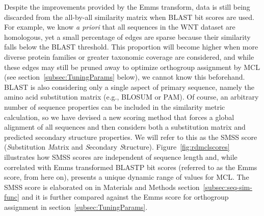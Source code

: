 \documentclass[twocolumn]{bmcart}  %
\begin{document}
Despite the improvements provided by the Emms transform, data is still being discarded from the all-by-all similarity matrix when BLAST bit scores are used.
For example, we know \textit{a priori} that all sequences in the WNT dataset are homologous, yet a small percentage of edges are sparse because their similarity falls below the BLAST threshold.
This proportion will become higher when more diverse protein families or greater taxonomic coverage are considered, and while these edges may still be pruned away to optimize orthogroup assignment by MCL (see section~\ref{subsec:TuningParams} below), we cannot know this beforehand.
BLAST is also considering only a single aspect of primary sequence, namely the amino acid substitution matrix (e.g., BLOSUM or PAM).
Of course, an arbitrary number of sequence properties can be included in the similarity metric calculation, so we have devised a new scoring method that forces a global alignment of all sequences and then considers both a substitution matrix and predicted secondary structure properties.
We will refer to this as the SMSS score (\textit{S}ubstitution \textit{M}atrix and \textit{S}econdary \textit{S}tructure).
Figure~\ref{fig:rdmclscores} illustrates how SMSS scores are independent of sequence length and, while correlated with Emms transformed BLASTP bit scores (referred to as the Emms score, from here on), presents a unique dynamic range of values for MCL\@.
The SMSS score is elaborated on in Materials and Methods section~\ref{subsec:seq-sim-func} and it is further compared against the Emms score for orthogroup assignment in section~\ref{subsec:TuningParams}.
\end{document}
